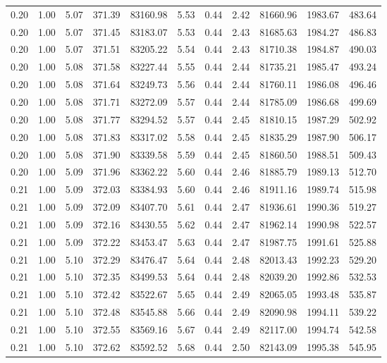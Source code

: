 \begin{table}[!ht]
\begin{tabular}{rrrrrrrrrrr}
0.20 & 1.00 & 5.07 & 371.39 & 83160.98 & 5.53 & 0.44 & 2.42 & 81660.96 & 1983.67 & 483.64 \\
0.20 & 1.00 & 5.07 & 371.45 & 83183.07 & 5.53 & 0.44 & 2.43 & 81685.63 & 1984.27 & 486.83 \\
0.20 & 1.00 & 5.07 & 371.51 & 83205.22 & 5.54 & 0.44 & 2.43 & 81710.38 & 1984.87 & 490.03 \\
0.20 & 1.00 & 5.08 & 371.58 & 83227.44 & 5.55 & 0.44 & 2.44 & 81735.21 & 1985.47 & 493.24 \\
0.20 & 1.00 & 5.08 & 371.64 & 83249.73 & 5.56 & 0.44 & 2.44 & 81760.11 & 1986.08 & 496.46 \\
0.20 & 1.00 & 5.08 & 371.71 & 83272.09 & 5.57 & 0.44 & 2.44 & 81785.09 & 1986.68 & 499.69 \\
0.20 & 1.00 & 5.08 & 371.77 & 83294.52 & 5.57 & 0.44 & 2.45 & 81810.15 & 1987.29 & 502.92 \\
0.20 & 1.00 & 5.08 & 371.83 & 83317.02 & 5.58 & 0.44 & 2.45 & 81835.29 & 1987.90 & 506.17 \\
0.20 & 1.00 & 5.08 & 371.90 & 83339.58 & 5.59 & 0.44 & 2.45 & 81860.50 & 1988.51 & 509.43 \\
0.20 & 1.00 & 5.09 & 371.96 & 83362.22 & 5.60 & 0.44 & 2.46 & 81885.79 & 1989.13 & 512.70 \\
0.21 & 1.00 & 5.09 & 372.03 & 83384.93 & 5.60 & 0.44 & 2.46 & 81911.16 & 1989.74 & 515.98 \\
0.21 & 1.00 & 5.09 & 372.09 & 83407.70 & 5.61 & 0.44 & 2.47 & 81936.61 & 1990.36 & 519.27 \\
0.21 & 1.00 & 5.09 & 372.16 & 83430.55 & 5.62 & 0.44 & 2.47 & 81962.14 & 1990.98 & 522.57 \\
0.21 & 1.00 & 5.09 & 372.22 & 83453.47 & 5.63 & 0.44 & 2.47 & 81987.75 & 1991.61 & 525.88 \\
0.21 & 1.00 & 5.10 & 372.29 & 83476.47 & 5.64 & 0.44 & 2.48 & 82013.43 & 1992.23 & 529.20 \\
0.21 & 1.00 & 5.10 & 372.35 & 83499.53 & 5.64 & 0.44 & 2.48 & 82039.20 & 1992.86 & 532.53 \\
0.21 & 1.00 & 5.10 & 372.42 & 83522.67 & 5.65 & 0.44 & 2.49 & 82065.05 & 1993.48 & 535.87 \\
0.21 & 1.00 & 5.10 & 372.48 & 83545.88 & 5.66 & 0.44 & 2.49 & 82090.98 & 1994.11 & 539.22 \\
0.21 & 1.00 & 5.10 & 372.55 & 83569.16 & 5.67 & 0.44 & 2.49 & 82117.00 & 1994.74 & 542.58 \\
0.21 & 1.00 & 5.10 & 372.62 & 83592.52 & 5.68 & 0.44 & 2.50 & 82143.09 & 1995.38 & 545.95 \\

\end{tabular}
\end{table}

